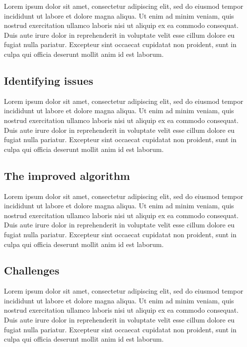 \documentclass[10pt,twocolumn,letterpaper]{article}
\begin{document}
Lorem ipsum dolor sit amet, consectetur adipiscing elit, sed do eiusmod tempor
incididunt ut labore et dolore magna aliqua. Ut enim ad minim veniam, quis
nostrud exercitation ullamco laboris nisi ut aliquip ex ea commodo consequat.
Duis aute irure dolor in reprehenderit in voluptate velit esse cillum dolore eu
fugiat nulla pariatur. Excepteur sint occaecat cupidatat non proident, sunt in
culpa qui officia deserunt mollit anim id est laborum.


\subsection{Identifying issues}\label{subsec:identifying-issues}

Lorem ipsum dolor sit amet, consectetur adipiscing elit, sed do eiusmod tempor
incididunt ut labore et dolore magna aliqua. Ut enim ad minim veniam, quis
nostrud exercitation ullamco laboris nisi ut aliquip ex ea commodo consequat.
Duis aute irure dolor in reprehenderit in voluptate velit esse cillum dolore eu
fugiat nulla pariatur. Excepteur sint occaecat cupidatat non proident, sunt in
culpa qui officia deserunt mollit anim id est laborum.


\subsection{The improved algorithm}\label{subsec:the-improved-algorithm}

Lorem ipsum dolor sit amet, consectetur adipiscing elit, sed do eiusmod tempor
incididunt ut labore et dolore magna aliqua. Ut enim ad minim veniam, quis
nostrud exercitation ullamco laboris nisi ut aliquip ex ea commodo consequat.
Duis aute irure dolor in reprehenderit in voluptate velit esse cillum dolore eu
fugiat nulla pariatur. Excepteur sint occaecat cupidatat non proident, sunt in
culpa qui officia deserunt mollit anim id est laborum.


\subsection{Challenges}\label{subsec:challenges}

Lorem ipsum dolor sit amet, consectetur adipiscing elit, sed do eiusmod tempor
incididunt ut labore et dolore magna aliqua. Ut enim ad minim veniam, quis
nostrud exercitation ullamco laboris nisi ut aliquip ex ea commodo consequat.
Duis aute irure dolor in reprehenderit in voluptate velit esse cillum dolore eu
fugiat nulla pariatur. Excepteur sint occaecat cupidatat non proident, sunt in
culpa qui officia deserunt mollit anim id est laborum.
\end{document}
